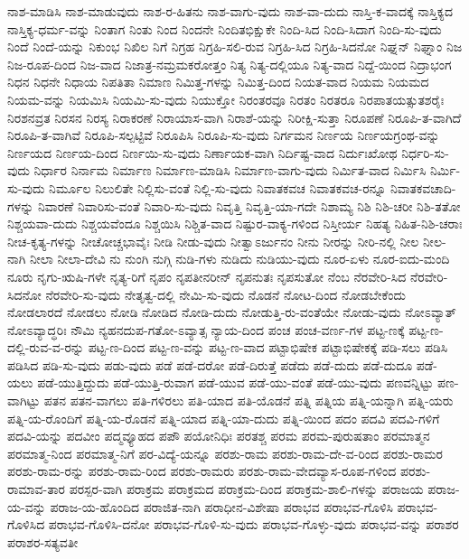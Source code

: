 ನಾಶ-ಮಾಡಿಸಿ
ನಾಶ-ಮಾಡುವುದು
ನಾಶ-ರ-ಹಿತನು
ನಾಶ-ವಾಗು-ವುದು
ನಾಶ-ವಾ-ದುದು
ನಾಸ್ತಿ-ಕ-ವಾದಕ್ಕೆ
ನಾಸ್ತಿಕ್ಯದ
ನಾಸ್ತಿಕ್ಯ-ಧರ್ಮ-ವನ್ನು
ನಿಂತಾಗ
ನಿಂತು
ನಿಂದ
ನಿಂದನೇ
ನಿಂದಿತಭಿಕ್ಷುಕೇ
ನಿಂದಿ-ಸಿದ
ನಿಂದಿ-ಸಿದಾಗ
ನಿಂದಿ-ಸು-ವುದು
ನಿಂದೆ
ನಿಂದೆ-ಯನ್ನು
ನಿಕುಂಭ
ನಿಖಿಲ
ನಿಗೆ
ನಿಗ್ರಹ
ನಿಗ್ರಹಿ-ಸಲಿ-ರುವ
ನಿಗ್ರಹಿ-ಸಿದ
ನಿಗ್ರಹಿ-ಸಿದನೋ
ನಿಘ್ನನ್
ನಿಘ್ನಾಂ
ನಿಜ
ನಿಜ-ರೂಪ-ದಿಂದ
ನಿಜ-ವಾದ
ನಿಜಾತ್ರ-ನಮ್ರಮಕರೋತ್ತಂ
ನಿತ್ಯ
ನಿತ್ಯ-ದಲ್ಲಿಯೂ
ನಿತ್ಯ-ವಾದ
ನಿದ್ದೆ-ಯಿಂದ
ನಿದ್ರಾಭಂಗ
ನಿಧನ
ನಿಧನೇ
ನಿಧಾಯ
ನಿಪತಿತಾ
ನಿಮಾಣ
ನಿಮಿತ್ತ-ಗಳನ್ನು
ನಿಮಿತ್ತ-ದಿಂದ
ನಿಯತ-ವಾದ
ನಿಯಮ
ನಿಯಮದ
ನಿಯಮ-ವನ್ನು
ನಿಯಮಿಸಿ
ನಿಯಮಿ-ಸು-ವುದು
ನಿಯುಕ್ತೋ
ನಿರಂತರವೂ
ನಿರತಂ
ನಿರತರೂ
ನಿರಪಾತಯತ್ಸುತಶರೈಃ
ನಿರಶನವ್ರತ
ನಿರಸನ
ನಿರಸ್ಯ
ನಿರಾಕರಣೆ
ನಿರಾಯಾಸ-ವಾಗಿ
ನಿರಾಶೆ-ಯನ್ನು
ನಿರೀಕ್ಷಿ-ಸುತ್ತಾ
ನಿರೂಪಣೆ
ನಿರೂಪಿ-ತ-ವಾಗಿದೆ
ನಿರೂಪಿ-ತ-ವಾಗಿವೆ
ನಿರೂಪಿ-ಸಲ್ಪಟ್ಟಿವೆ
ನಿರೂಪಿಸಿ
ನಿರೂಪಿ-ಸು-ವುದು
ನಿರ್ಗಮನ
ನಿರ್ಣಯ
ನಿರ್ಣಯಗ್ರಂಥ-ವನ್ನು
ನಿರ್ಣಯದ
ನಿರ್ಣಯ-ದಿಂದ
ನಿರ್ಣಯಿ-ಸು-ವುದು
ನಿರ್ಣಾಯಕ-ವಾಗಿ
ನಿರ್ದಿಷ್ಟ-ವಾದ
ನಿರ್ದುಃಖೋಥ
ನಿರ್ಧರಿ-ಸು-ವುದು
ನಿರ್ಧಾರ
ನಿರ್ನಾಮ
ನಿರ್ಮಾಣ
ನಿರ್ಮಾಣ-ಮಾಡಿಸಿ
ನಿರ್ಮಾಣ-ವಾಗು-ವುದು
ನಿರ್ಮಿತ-ವಾದ
ನಿರ್ಮಿಸಿ
ನಿರ್ಮಿ-ಸು-ವುದು
ನಿರ್ಮೂಲ
ನಿಲುಲಿತೇ
ನಿಲ್ಲಿಸು-ವಂತೆ
ನಿಲ್ಲಿ-ಸು-ವುದು
ನಿವಾತಕವಚ
ನಿವಾತಕವಚ-ರನ್ನೂ
ನಿವಾತಕವಚಾದಿ-ಗಳನ್ನು
ನಿವಾರಣೆ
ನಿವಾರಿಸು-ವಂತೆ
ನಿವಾರಿ-ಸು-ವುದು
ನಿವೃತ್ತಿ
ನಿವೃತ್ತಿ-ಯಾ-ಗದೇ
ನಿಶಾಮ್ಯ
ನಿಶಿ
ನಿಶಿ-ಚರೀ
ನಿಶಿ-ತತೋ
ನಿಶ್ಚಯವಾ-ದುದು
ನಿಶ್ಚಯವೆಂದೂ
ನಿಶ್ಚಯಿಸಿ
ನಿಶ್ಚಿತ-ವಾದ
ನಿಷ್ಟುರ-ವಾಕ್ಯ-ಗಳಿಂದ
ನಿಸ್ತೀರ್ಯ
ನಿಹತ್ಯ
ನಿಹಿತ-ನಿಶಿ-ಚರಾಃ
ನೀಚ-ಕೃತ್ಯ-ಗಳನ್ನು
ನೀಚೋಚ್ಚಭಾವೈಃ
ನೀಡಿ
ನೀಡು-ವುದು
ನೀತ್ವಾಽರ್ಜುನಂ
ನೀನು
ನೀರನ್ನು
ನೀರಿ-ನಲ್ಲಿ
ನೀಲ
ನೀಲ-ನಾಗಿ
ನೀಲಾ
ನೀಲಾ-ದೇವಿ
ನು
ನುಂಗಿ
ನುಗ್ಗಿ
ನುಡಿ-ಗಳು
ನುಡಿದು
ನುಡಿಯು-ವುದು
ನೂರ-ಏಳು
ನೂರ-ಐದು-ಮಂದಿ
ನೂರು
ನೃಗು-ಋಷಿ-ಗಳೇ
ನೃತ್ಯ-ರಿಗೆ
ನೃಪಂ
ನೃಪತೀನರೀನ್
ನೃಪನುತಃ
ನೃಪಸುತೋ
ನೆಂಬ
ನೆರವೇರಿ-ಸಿದ
ನೆರವೇರಿ-ಸಿದನೋ
ನೆರವೇರಿ-ಸು-ವುದು
ನೇತೃತ್ವ-ದಲ್ಲಿ
ನೇಮಿ-ಸು-ವುದು
ನೊಡನೆ
ನೋಟ-ದಿಂದ
ನೋಡಬೇಕೆಂದು
ನೋಡಲಾರದೆ
ನೋಡಲು
ನೋಡಿ
ನೋಡಿದ
ನೋಡಿ-ದುದು
ನೋಡುತ್ತಿ-ರು-ವಂತೆಯೇ
ನೋಡು-ವುದು
ನೋಽವ್ಯಾತ್
ನೋಽವ್ಯಾದ್ಧರಿಃ
ನೌಮಿ
ನ್ಯಹನದುಪ-ಗತೋ-ಽವ್ಯಾತ್ಸ
ನ್ಯಾಯ-ದಿಂದ
ಪಂಚ
ಪಂಚ-ವರ್ಣ-ಗಳ
ಪಟ್ಟ-ಣಕ್ಕೆ
ಪಟ್ಟ-ಣ-ದಲ್ಲಿ-ರುವ-ವ-ರನ್ನು
ಪಟ್ಟ-ಣ-ದಿಂದ
ಪಟ್ಟ-ಣ-ವನ್ನು
ಪಟ್ಟ-ಣ-ವಾದ
ಪಟ್ಟಾಭಿಷೇಕ
ಪಟ್ಟಾಭಿಷೇಕಕ್ಕೆ
ಪಡಿ-ಸಲು
ಪಡಿಸಿ
ಪಡಿಸಿದ
ಪಡಿ-ಸು-ವುದು
ಪಡು-ವುದು
ಪಡೆ
ಪಡೆ-ದರೋ
ಪಡೆ-ದಿರುತ್ತೆ
ಪಡೆದು
ಪಡೆ-ದುದು
ಪಡೆ-ದುದೂ
ಪಡೆ-ಯಲು
ಪಡೆ-ಯುತ್ತಿದ್ದುದು
ಪಡೆ-ಯುತ್ತಿ-ರುವಾಗ
ಪಡೆ-ಯುವ
ಪಡೆ-ಯು-ವಂತೆ
ಪಡೆ-ಯು-ವುದು
ಪಣವನ್ನಿಟ್ಟು
ಪಣ-ವಾಗಿಟ್ಟು
ಪತನ
ಪತನ-ವಾಗಲು
ಪತಿ-ಗಳಿರಲು
ಪತಿ-ಯಾದ
ಪತಿ-ಯೊಡನೆ
ಪತ್ನಿ
ಪತ್ನಿಯ
ಪತ್ನಿ-ಯನ್ನಾಗಿ
ಪತ್ನಿ-ಯರು
ಪತ್ನಿ-ಯ-ರೊಂದಿಗೆ
ಪತ್ನಿ-ಯ-ರೊಡನೆ
ಪತ್ನಿ-ಯಾದ
ಪತ್ನಿ-ಯಾ-ದುದು
ಪತ್ನಿ-ಯಿಂದ
ಪದಂ
ಪದವಿ
ಪದವಿ-ಗಳಿಗೆ
ಪದವಿ-ಯನ್ನು
ಪದವೀಂ
ಪದ್ಮವ್ಯೂಹದ
ಪಪೌ
ಪಯೋನಿಧಿಃ
ಪರತಶ್ಚ
ಪರಮ
ಪರಮ-ಪುರುಷತಾಂ
ಪರಮಾತ್ಮನ
ಪರಮಾತ್ಮ-ನಿಂದ
ಪರಮಾತ್ಮ-ನಿಗೆ
ಪರ-ವಿದ್ಯೆ-ಯನ್ನೂ
ಪರಶು-ರಾಮ
ಪರಶು-ರಾಮ-ದೇ-ವ-ರಿಂದ
ಪರಶು-ರಾಮರ
ಪರಶು-ರಾಮ-ರನ್ನು
ಪರಶು-ರಾಮ-ರಿಂದ
ಪರಶು-ರಾಮರು
ಪರಶು-ರಾಮ-ವೇದವ್ಯಾಸ-ರೂಪ-ಗಳಿಂದ
ಪರಶು-ರಾಮಾವ-ತಾರ
ಪರಸ್ಪರ-ವಾಗಿ
ಪರಾಕ್ರಮ
ಪರಾಕ್ರಮದ
ಪರಾಕ್ರಮ-ದಿಂದ
ಪರಾಕ್ರಮ-ಶಾಲಿ-ಗಳನ್ನು
ಪರಾಜಯ
ಪರಾಜ-ಯ-ವನ್ನು
ಪರಾಜ-ಯ-ಹೊಂದಿದ
ಪರಾಜಿತ-ನಾಗಿ
ಪರಾಧೀನ-ವಿಶೇಷಾ
ಪರಾಭವ
ಪರಾಭವ-ಗೊಳಿಸಿ
ಪರಾಭವ-ಗೊಳಿಸಿದ
ಪರಾಭವ-ಗೊಳಿಸಿ-ದನೋ
ಪರಾಭವ-ಗೊಳಿ-ಸು-ವುದು
ಪರಾಭವ-ಗೊಳ್ಳು-ವುದು
ಪರಾಭವ-ವನ್ನು
ಪರಾಶರ
ಪರಾಶರ-ಸತ್ಯವತೀ
